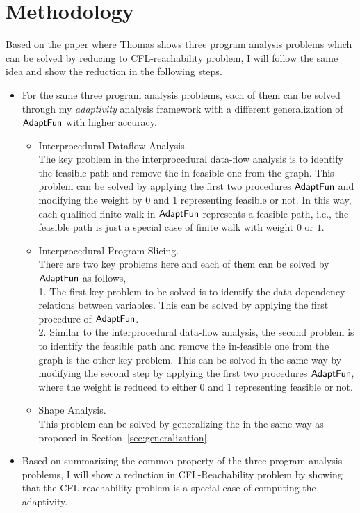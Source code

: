 \section{Methodology}
\label{subsec:cfl-methodology}
Based on the paper\cite{Reps98} where Thomas shows 
three program analysis problems 
which can be solved by reducing to CFL-reachability problem, I will follow the same idea and show the reduction
in the following steps.
\begin{itemize}
 \item For the same three program analysis problems, each of them 
 can be solved through my \emph{adaptivity} analysis framework with 
 a different generalization of $\textsf{AdaptFun}$ with higher accuracy.
 \begin{itemize}
 \item Interprocedural Dataflow Analysis.
 \\
 The key problem in the interprocedural data-flow analysis is to identify the feasible path and remove 
 the in-feasible one from the graph.
 This problem can be solved by applying the first two procedures $\textsf{AdaptFun}$ and modifying the weight
 by $0$ and $1$ representing feasible or not. In this way, each qualified finite walk-in 
 $\textsf{AdaptFun}$ represents a feasible path, i.e., the feasible path is just a special case of finite walk 
 with weight $0$ or $1$.
 \item Interprocedural Program Slicing.
 \\
 There are two key problems here and each of them can be solved by $\textsf{AdaptFun}$ as follows,
 \\ 
 1. The first key problem to be solved is to identify the data dependency relations between variables. 
 This can be solved by applying the first procedure of $\textsf{AdaptFun}$.
 \\
 2. Similar to the interprocedural data-flow analysis, the second problem is to identify the feasible path and remove 
 the in-feasible one from the graph is the other key problem. 
 This can be solved in the same way by modifying the second step by applying the first two procedures $\textsf{AdaptFun}$,
 where the weight is reduced to either $0$ and $1$ representing feasible or not.
 \item Shape Analysis.
 \\
 This problem can be solved by generalizing the in the same way as proposed in Section~\ref{sec:generalization}.
 \end{itemize}
 \item Based on summarizing the common property of the three program analysis problems,
 I will show a reduction in CFL-Reachability problem 
 by showing that the CFL-reachability problem is a special case of 
 computing the adaptivity. 
\end{itemize}

